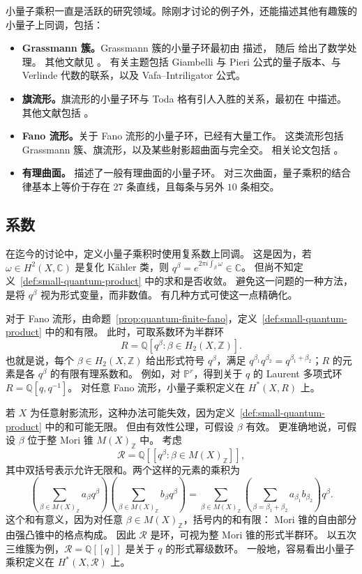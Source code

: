 小量子乘积一直是活跃的研究领域。除刚才讨论的例子外，还能描述其他有趣簇的小量子上同调，包括：
\begin{itemize}
\item \textbf{Grassmann 簇。}Grassmann 簇的小量子环最初由  描述，
随后  给出了数学处理。
其他文献见 。
有关主题包括 Giambelli 与 Pieri 公式的量子版本、与 Verlinde 代数的联系，以及 Vafa--Intriligator 公式。
\item \textbf{旗流形。}旗流形的小量子环与 Toda 格有引人入胜的关系，最初在  中描述。
其他文献包括 。
\item \textbf{Fano 流形。}关于 Fano 流形的小量子环，已经有大量工作。
这类流形包括 Grassmann 簇、旗流形，以及某些射影超曲面与完全交。
相关论文包括 。
\item \textbf{有理曲面。} 描述了一般有理曲面的小量子环。
对三次曲面，量子乘积的结合律基本上等价于存在 $27$ 条直线，且每条与另外 $10$ 条相交。
\end{itemize}

\subsection{系数}\label{subsec:formal-small-quantum}
在迄今的讨论中，定义小量子乘积时使用复系数上同调。
这是因为，若 $\omega\in H^2(X,\mathbb C)$ 是复化 Kähler 类，则
$q^\beta=e^{2\pi i\int_\beta\omega}\in\mathbb C$。
但尚不知定义~\ref{def:small-quantum-product} 中的求和是否收敛。
避免这一问题的一种方法，是将 $q^\beta$ 视为形式变量，而非数值。
有几种方式可使这一点精确化。

对于 Fano 流形，由命题~\ref{prop:quantum-finite-fano}，定义~\ref{def:small-quantum-product} 中的和有限。
此时，可取系数环为半群环
\[
R=\mathbb Q[q^\beta:\beta\in H_2(X,\mathbb Z)].
\]
也就是说，每个 $\beta\in H_2(X,\mathbb Z)$ 给出形式符号 $q^\beta$，满足
$q^{\beta_1}q^{\beta_2}=q^{\beta_1+\beta_2}$；$R$ 的元素是各 $q^\beta$ 的有限有理系数和。
例如，对 $\mathbb P^r$，得到关于 $q$ 的 Laurent 多项式环 $R=\mathbb Q[q,q^{-1}]$。
对任意 Fano 流形，小量子乘积定义在 $H^*(X,R)$ 上。

若 $X$ 为任意射影流形，这种办法可能失效，因为定义~\ref{def:small-quantum-product} 中的和可能无限。
但由有效性公理，可假设 $\beta$ 有效。
更准确地说，可假设 $\beta$ 位于整 Mori 锥 $M(X)_{\mathbb Z}$ 中。
考虑
\[
\mathcal R=\mathbb Q[[q^\beta:\beta\in M(X)_{\mathbb Z}]],
\]
其中双括号表示允许无限和。两个这样的元素的乘积为
\[
\left(\sum_{\beta\in M(X)_{\mathbb Z}}a_\beta q^\beta\right)
\left(\sum_{\beta\in M(X)_{\mathbb Z}}b_\beta q^\beta\right)
=\sum_{\beta\in M(X)_{\mathbb Z}}
\left(\sum_{\beta=\beta_1+\beta_2}a_{\beta_1}b_{\beta_2}\right)q^\beta.
\]
这个和有意义，因为对任意 $\beta\in M(X)_{\mathbb Z}$，括号内的和有限：
Mori 锥的自由部分由强凸锥中的格点构成。
因此 $\mathcal R$ 是环，可视为整 Mori 锥的形式半群环。
以五次三维簇为例，$\mathcal R=\mathbb Q[[q]]$ 是关于 $q$ 的形式幂级数环。
一般地，容易看出小量子乘积定义在 $H^*(X,\mathcal R)$ 上。

